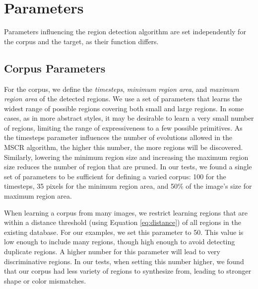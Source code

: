 \documentclass[a4paper,11pt,final]{ThesisStyle}
\begin{document}
\section{Parameters}  
Parameters influencing the region detection algorithm are set independently for the corpus and the target, as their function differs.
\subsection{Corpus Parameters}\vspace{-0.4em}
\label{sec:parameters}
For the corpus, we define the \textit{timesteps}, \textit{minimum region area}, and \textit{maximum region area} of the detected regions.  We use a set of parameters that learns the widest range of possible regions covering both small and large regions.  In some cases, as in more abstract styles, it may be desirable to learn a very small number of regions, limiting the range of expressiveness to a few possible primitives.  As the timesteps parameter influences the number of evolutions allowed in the MSCR algorithm, the higher this number, the more regions will be discovered.  Similarly, lowering the minimum region size and increasing the maximum region size reduces the number of region that are pruned.  In our tests, we found a single set of parameters to be sufficient for defining a varied corpus: 100 for the timesteps, 35 pixels for the minimum region area, and 50\% of the image's size for maximum region area.

When learning a corpus from many images, we restrict learning regions that are within a distance threshold (using Equation \ref{eq:distance}) of all regions in the existing database.  For our examples, we set this parameter to 50.  This value is low enough to include many regions, though high enough to avoid detecting duplicate regions.  A higher number for this parameter will lead to very discriminative regions.  In our tests, when setting this number higher, we found that our corpus had less variety of regions to synthesize from, leading to stronger shape or color mismatches.  
\end{document}
